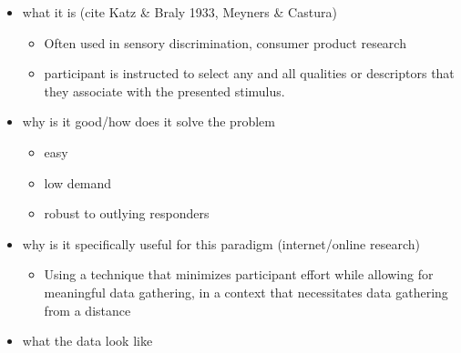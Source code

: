\documentclass[
  english,
  man]{apa6}
\providecommand{\tightlist}{%
  \setlength{\itemsep}{0pt}\setlength{\parskip}{0pt}}
\begin{document}
\begin{itemize}
\tightlist
\item
  what it is (cite Katz \& Braly 1933, Meyners \& Castura)

  \begin{itemize}
  \tightlist
  \item
    Often used in sensory discrimination, consumer product research
  \item
    participant is instructed to select any and all qualities or descriptors that they associate with the presented stimulus.
  \end{itemize}
\item
  why is it good/how does it solve the problem

  \begin{itemize}
  \tightlist
  \item
    easy
  \item
    low demand
  \item
    robust to outlying responders
  \end{itemize}
\item
  why is it specifically useful for this paradigm (internet/online research)

  \begin{itemize}
  \tightlist
  \item
    Using a technique that minimizes participant effort while allowing for meaningful data gathering, in a context that necessitates data gathering from a distance
  \end{itemize}
\item
  what the data look like


\end{itemize}
\end{document}
